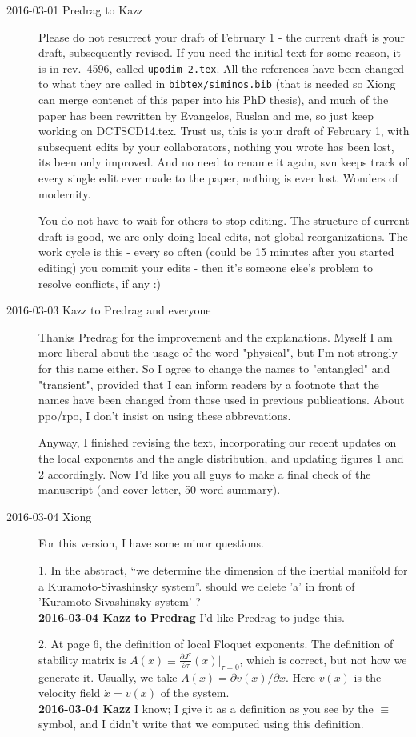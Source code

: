 \begin{description}
\item[2016-03-01 Predrag to Kazz]
{\large Please do not resurrect}
your draft of February 1 - the current draft is your draft, subsequently revised. If
you need the initial text for some reason, it is in rev.~4596, called
\texttt{upodim-2.tex}. All the references have been changed to what they
are called in \texttt{bibtex/siminos.bib} (that is needed so Xiong can merge
contenct of this paper into his PhD thesis), and much of the paper has been
rewritten by Evangelos, Ruslan and me, so just keep working on
DCTSCD14.tex. Trust us, this is your draft of February 1, with subsequent
edits by your collaborators, nothing you wrote has been lost, its been
only improved. And no need to rename it again, svn keeps track of every
single edit ever made to the paper, nothing is ever lost. Wonders of
modernity.

You do not have to wait for others to stop editing. The structure of
current draft is good, we are only doing local edits, not global
reorganizations. The work cycle is this - every so often (could be 15
minutes after you started editing) you commit your edits - then it's
someone else's problem to resolve conflicts, if any :)

\item[2016-03-03 Kazz to Predrag and everyone]
Thanks Predrag for the improvement and the explanations. Myself I am more liberal about the usage of the word "physical", but I'm not strongly for this name either. So I agree to change the names to "entangled" and "transient", provided that I can inform readers by a footnote that the names have been changed from those used in previous publications. About ppo/rpo, I don't insist on using these abbrevations.

Anyway, I finished revising the text, incorporating our recent updates on the local exponents and the angle distribution, and updating figures 1 and 2 accordingly. Now I'd like you all guys to make a final check of the manuscript (and cover letter, 50-word summary).

\item[2016-03-04 Xiong ]
For this version, I have some minor questions.

1. In the abstract, ``we determine the dimension of the inertial manifold
for a Kuramoto-Sivashinsky system''. should we delete 'a' in front of
'Kuramoto-Sivashinsky system' ? \\
{\bf 2016-03-04 Kazz to Predrag}
I'd like Predrag to judge this.

2. At page 6, the definition of local Floquet exponents. The definition
of stability matrix is
$A(x)\equiv\frac{\partial{}J^\tau}{\partial\tau}(x)|_{\tau=0}$,
which is correct, but not how we generate it. Usually, we take
$A(x) = \partial v(x) / \partial x$. Here $v(x)$ is the velocity field
$\dot{x} = v(x)$ of the system. \\
{\bf 2016-03-04 Kazz}
I know; I give it as a definition as you see by the $\equiv$ symbol, and I didn't write that we computed using this definition.


\end{description}

